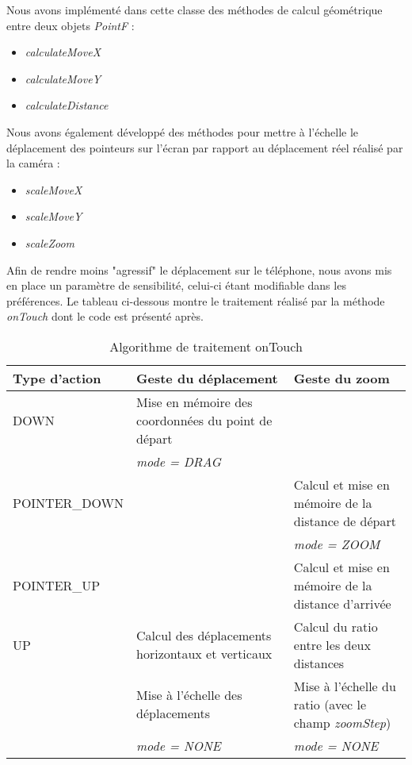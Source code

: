 Nous avons implémenté dans cette classe des méthodes de calcul géométrique entre deux objets \textit{PointF} :
\begin{itemize}
	\item \textit{calculateMoveX}
	\item \textit{calculateMoveY}
	\item \textit{calculateDistance}
\end{itemize}

Nous avons également développé des méthodes pour mettre à l'échelle le déplacement des pointeurs sur l'écran par rapport au déplacement réel réalisé par la caméra :
\begin{itemize}
	\item \textit{scaleMoveX}
	\item \textit{scaleMoveY}
	\item \textit{scaleZoom}
\end{itemize}

Afin de rendre moins "agressif" le déplacement sur le téléphone, nous avons mis en place un paramètre de sensibilité, celui-ci étant
modifiable dans les préférences.
Le tableau ci-dessous montre le traitement réalisé par la méthode
\textit{onTouch} dont le code est présenté après.\newline
\begin{table}[!h]
\begin{tabular}{|p{0.3\linewidth}|p{0.4\linewidth}| p{0.4\linewidth}|}
\hline
Type d'action & Geste du déplacement & Geste du zoom \\
\hline
DOWN & Mise en mémoire des coordonnées du point de départ &  \\
 & \textit{mode = DRAG} & \\
POINTER\_DOWN & & Calcul et mise en mémoire de la distance de départ \\
 & & \textit{mode = ZOOM} \\
POINTER\_UP & & Calcul et mise en mémoire de la distance d'arrivée \\
UP & Calcul des déplacements horizontaux et verticaux & Calcul du ratio entre les deux distances \\
 & Mise à l'échelle des déplacements & Mise à l'échelle du ratio (avec le champ \textit{zoomStep}) \\
 & \textit{mode = NONE} & \textit{mode = NONE} \\
\hline
\end{tabular}
\caption{Algorithme de traitement onTouch}
\end{table}
